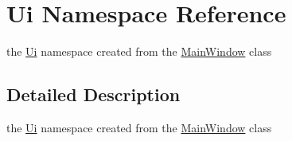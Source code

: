 \hypertarget{namespace_ui}{
\section{Ui Namespace Reference}
\label{namespace_ui}
}


the \hyperlink{namespace_ui}{Ui} namespace created from the \hyperlink{class_main_window}{MainWindow} class  




\subsection{Detailed Description}
the \hyperlink{namespace_ui}{Ui} namespace created from the \hyperlink{class_main_window}{MainWindow} class 